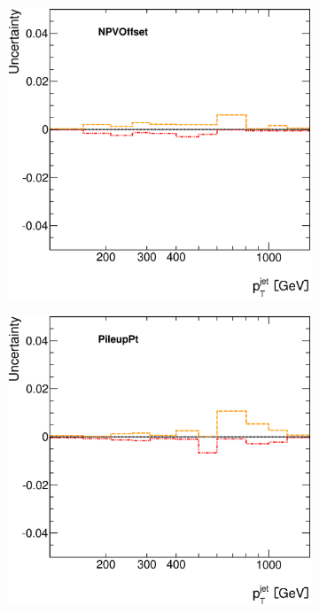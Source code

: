 \documentclass[12pt, twoside]{article}
\numberwithin{equation}{section}
\numberwithin{figure}{section}
\newenvironment{changemargin}[2]{%
\begin{list}{}{%
\setlength{\topsep}{0pt}%
\setlength{\leftmargin}{#1}%
\setlength{\rightmargin}{#2}%
\setlength{\listparindent}{\parindent}%
\setlength{\itemindent}{\parindent}%
\setlength{\parsep}{\parskip}%
}%
\item[]}{\end{list}}
\begin{document}
\begin{figure}[H]
\begin{changemargin}{-1.0cm}{-0.75cm}
\begin{changemargin}{-0.75cm}{-1.0cm}
\begin{subfigure}[b]{0.25\textwidth}
        \end{subfigure}
        \begin{subfigure}[b]{0.25\textwidth}
            \includegraphics[width=\textwidth]{./images/JetSystematics/JetSystematic-39.eps}
        \end{subfigure}
        \begin{subfigure}[b]{0.25\textwidth}
            \includegraphics[width=\textwidth]{./images/JetSystematics/JetSystematic-40.eps}
        \end{subfigure}
    \end{changemargin}


\end{changemargin}
\end{figure}
\end{document}
